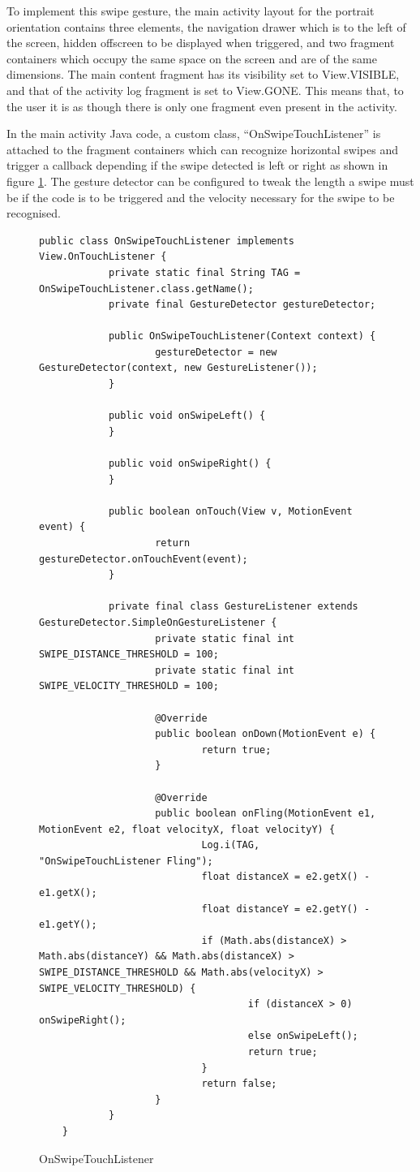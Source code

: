 \FloatBarrier

\FloatBarrier

To implement this swipe gesture, the main activity layout for the portrait orientation contains three elements, the navigation drawer which is to the left of the screen, hidden offscreen to be displayed when triggered, and two fragment containers which occupy the same space on the screen and are of the same dimensions.  The main content fragment has its visibility set to View.VISIBLE, and that of the activity log fragment is set to View.GONE.  This means that, to the user it is as though there is only one fragment even present in the activity.

In the main activity Java code, a custom class, ``OnSwipeTouchListener'' is attached to the fragment containers which can recognize horizontal swipes and trigger a callback depending if the swipe detected is left or right as shown in figure \ref{fig:ostl}.  The gesture detector can be configured to tweak the length a swipe must be if the code is to be triggered and the velocity necessary for the swipe to be recognised.

\begin{figure}[!htpb]
	\centering
	\lstset{language=Java}
	\begin{lstlisting}[tabsize=2,breaklines=true]
	public class OnSwipeTouchListener implements View.OnTouchListener {
			private static final String TAG = OnSwipeTouchListener.class.getName();
			private final GestureDetector gestureDetector;

			public OnSwipeTouchListener(Context context) {
					gestureDetector = new GestureDetector(context, new GestureListener());
			}

			public void onSwipeLeft() {
			}

			public void onSwipeRight() {
			}

			public boolean onTouch(View v, MotionEvent event) {
					return gestureDetector.onTouchEvent(event);
			}

			private final class GestureListener extends GestureDetector.SimpleOnGestureListener {
					private static final int SWIPE_DISTANCE_THRESHOLD = 100;
					private static final int SWIPE_VELOCITY_THRESHOLD = 100;

					@Override
					public boolean onDown(MotionEvent e) {
							return true;
					}

					@Override
					public boolean onFling(MotionEvent e1, MotionEvent e2, float velocityX, float velocityY) {
							Log.i(TAG, "OnSwipeTouchListener Fling");
							float distanceX = e2.getX() - e1.getX();
							float distanceY = e2.getY() - e1.getY();
							if (Math.abs(distanceX) > Math.abs(distanceY) && Math.abs(distanceX) > SWIPE_DISTANCE_THRESHOLD && Math.abs(velocityX) > SWIPE_VELOCITY_THRESHOLD) {
									if (distanceX > 0) onSwipeRight();
									else onSwipeLeft();
									return true;
							}
							return false;
					}
			}
	}
	\end{lstlisting}
	\caption{OnSwipeTouchListener}
	\label{fig:ostl}

\end{figure}

